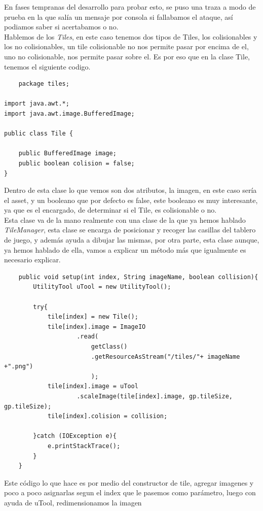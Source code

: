\documentclass[a4paper]{article}
\begin{document}
En fases tempranas del desarrollo para probar esto, se puso una traza a modo de prueba en la que salía un mensaje por consola si fallabamos el ataque, así podiamos saber si acertabamos o no.\\
\clearpage
Hablemos de los \textit{Tiles}, en este caso tenemos dos tipos de Tiles, los colisionables y los no colisionables, un tile colisionable no nos permite pasar por encima de el, uno no colisionable, nos permite pasar
sobre el. Es por eso que en la clase Tile, tenemos el siguiente codigo.
\begin{lstlisting}
    package tiles;

import java.awt.*;
import java.awt.image.BufferedImage;

public class Tile {

    public BufferedImage image;
    public boolean colision = false;
}
\end{lstlisting}
Dentro de esta clase lo que vemos son dos atributos, la imagen, en este caso sería el asset, y un booleano que por defecto es false, este booleano es muy interesante, ya que es el encargado, de determinar si el Tile, es colisionable o no.\\
Esta clase va de la mano realmente con una clase de la que ya hemos hablado \textit{TileManager}, esta clase se encarga de posicionar y recoger las casillas del tablero de juego, y además ayuda a dibujar las mismas, por otra parte, esta clase aunque,
ya hemos hablado de ella, vamos a explicar un método más que igualmente es necesario explicar.
\begin{lstlisting}
    public void setup(int index, String imageName, boolean collision){
        UtilityTool uTool = new UtilityTool();

        try{
            tile[index] = new Tile();
            tile[index].image = ImageIO
                    .read(
                        getClass()
                        .getResourceAsStream("/tiles/"+ imageName +".png")
                        );
            tile[index].image = uTool
                    .scaleImage(tile[index].image, gp.tileSize, gp.tileSize);
            tile[index].colision = collision;

        }catch (IOException e){
            e.printStackTrace();
        }
    }
\end{lstlisting}
Este código lo que hace es por medio del constructor de tile, agregar imagenes y poco a poco asignarlas segun el index que le pasemos como parámetro, luego con ayuda de uTool, redimensionamos la imagen
\end{document}
